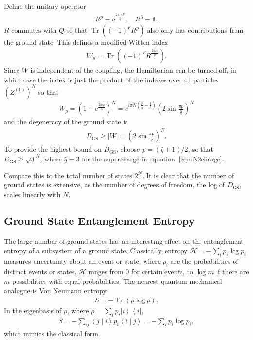 \documentclass[12pt]{article} %
\renewcommand{\cal}{\mathcal}
\newcommand{\abs}[1]{\left|#1\right|}
\renewcommand{\th}[1]{\frac{1}{#1}}
\newcommand{\e}{\text{e}}
\newcommand{\ket}[1]{\left|#1\right\rangle}
\newcommand{\bra}[1]{\left\langle#1\right|}
\newcommand{\braket}[2]{\left\langle#1\middle|#2\right\rangle}
\DeclareMathOperator{\Tr}{Tr}
\begin{document}
Define the unitary operator 
\begin{align}
R^p = \e^{\frac{2\pi ipF}{\hat q}},\quad R^3 = \mathbb{1}.
\end{align}
$R$ commutes with $Q$ so that $\Tr\left((-1)^FR^p\right)$ also only has contributions from the ground state. This defines a modified Witten index
\begin{align}
W_p = \Tr\left((-1)^FR^\frac{2\pi ip}{\hat q}\right).
\end{align}
Since $W$ is independent of the coupling, the Hamiltonian can be turned off, in which case the index is just the product of the indexes over all particles $\left(Z^{(1)}\right)^N$ so that 
\begin{align}
W_p = \left(1-\e^{\frac{2\pi ip}{3}}\right)^N = e^{i\pi N\left(\frac{p}{\hat q} - \th{2}\right)}\left(2\sin\frac{\pi p}{\hat q}\right)^N
\end{align}
and the degeneracy of the ground state is 
\begin{align}
D_\text{GS} \ge \abs{W} = \left(2\sin\frac{\pi p}{\hat q}\right)^N. \label{eqn:dgs}
\end{align}
To provide the highest bound on $D_\text{GS}$, choose $p = (\hat q+1)/2$, so that $D_\text{GS} \ge \sqrt{3}^N$, where $\hat q = 3$ for the supercharge in equation~\ref{eqn:N2charge}.

Compare this to the total number of states $2^N$. It is clear that the number of ground states is extensive, as the number of degrees of freedom, the log of $D_\text{GS}$, scales linearly with $N$.

\subsection{Ground State Entanglement Entropy} \emph{} \label{sub:entangle}

The large number of ground states has an interesting effect on the entanglement entropy of a subsystem of a ground state. Classically, entropy $\cal H = -\sum_ip_i\log p_i$ measures uncertainty about an event or state, where $p_i$ are the probabilities of distinct events or states. $\cal H$ ranges from 0 for certain events, to $\log m$ if there are $m$ possibilities with equal probabilities. The nearest quantum mechanical analogue is Von Neumann entropy
\begin{align}
S = -\Tr(\rho\log\rho).\label{eqn:vnent}
\end{align}
In the eigenbasis of $\rho$, where $\rho = \sum_i p_i\ket{i}\bra{i}$,
\begin{align}
S = -\sum_{ij}\braket{j}{i}p_i\braket{i}{j} = -\sum_ip_i\log p_i,
\end{align}
which mimics the classical form.
\end{document}
